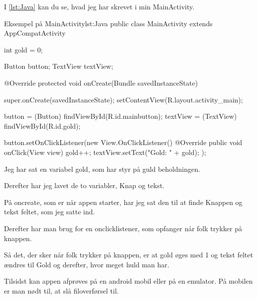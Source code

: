 I \autoref{lst:Java} kan du se, hvad jeg har skrevet i min MainActivity. 

\begin{JavaCode}{Eksempel på MainActivity}{lst:Java}
	public class MainActivity extends AppCompatActivity {
		int gold = 0;
		
		Button button;
		TextView textView;
		
		@Override
		protected void onCreate(Bundle savedInstanceState) {
			super.onCreate(savedInstanceState);
			setContentView(R.layout.activity_main);
			
			button = (Button) findViewById(R.id.mainbutton);
			textView = (TextView) findViewById(R.id.gold);
			
			button.setOnClickListener(new View.OnClickListener() {
				@Override
				public void onClick(View view) {
					gold++;
					textView.setText("Gold: " + gold);	
				}
			});
		}
	}
\end{JavaCode}

Jeg har sat en variabel gold, som har styr på guld beholdningen. 

Derefter har jeg lavet de to variabler, Knap og tekst. 

På oncreate, som er når appen starter, har jeg sat den til at finde Knappen og tekst feltet, som jeg satte ind. 

Derefter har man brug for en onclicklistener, som opfanger når folk trykker på knappen. 

Så det, der sker når folk trykker på knappen, er at gold øges med 1 og tekst feltet ændres til Gold og derefter, hvor meget huld man har. 

Tilsidst kan appen afprøves på en android mobil eller på en emulator. På mobilen er man nødt til,   at slå filoverførsel til. 






